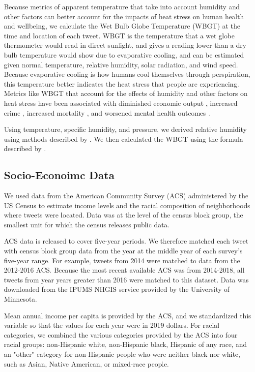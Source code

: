 \documentclass{article}
\begin{document}
Because metrics of apparent temperature that take into account humidity and other factors can better account for the impacts of heat stress on human health and wellbeing, we calculate the Wet Bulb Globe Temperature (WBGT) at the time and location of each tweet.  WBGT is the temperature that a wet globe thermometer would read in direct sunlight, and gives a reading lower than a dry bulb temperature would show due to evaporative cooling, and can be estimated given normal temperature, relative humidity, solar radiation, and wind speed.  Because evaporative cooling is how humans cool themselves through perspiration, this temperature better indicates the heat stress that people are experiencing.  Metrics like WBGT that account for the effects of humidity and other factors on heat stress have been associated with diminished economic output \cite{rao2020projections}, increased crime \cite{hu2017impact}, increased mortality \cite{chien2016spatiotemporal, armstrong2019role}, and worsened mental health outcomes \cite{vida2012relationship, ding2016importance}.

Using temperature, specific humidity, and pressure, we derived relative humidity using methods described by  \cite{bolton_computation_1980}.  We then calculated the WBGT using the formula described by \cite{heo2019comparison}.

\subsection{Socio-Econoimc Data}
We used data from the American Community Survey (ACS) administered by the US Census to estimate income levels and the racial composition of neighborhoods where tweets were located.  Data was at the level of the census block group, the smallest unit for which the census releases public data.

ACS data is released to cover five-year periods.  We therefore matched each tweet with census block group data from the year at the middle year of each survey's five-year range.  For example, tweets from 2014 were matched to data from the 2012-2016 ACS.  Because the most recent available ACS was from 2014-2018, all tweets from year years greater than 2016 were matched to this dataset.  Data was downloaded from the IPUMS NHGIS service provided by the University of Minnesota.

Mean annual income per capita is provided by the ACS, and we standardized this variable so that the values for each year were in 2019 dollars.  For racial categories, we combined the various categories provided by the ACS into four racial groups: non-Hispanic white, non-Hispanic black, Hispanic of any race, and an "other" category for non-Hispanic people who were neither black nor white, such as Asian, Native American, or mixed-race people.
\end{document}
